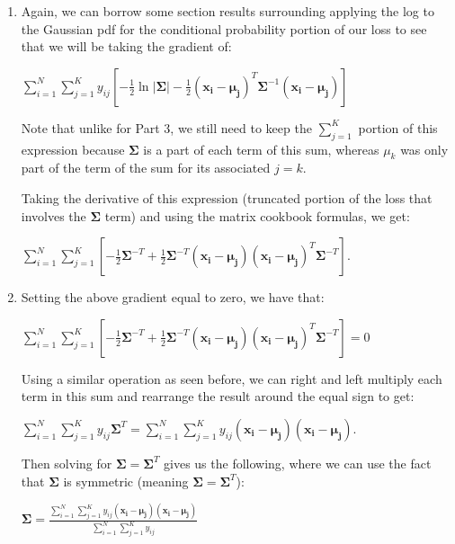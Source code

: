 \documentclass[submit]{harvardml}
\begin{document}
\begin{enumerate}
     \item  Again, we can borrow some section results surrounding applying the log to the Gaussian pdf for the conditional probability portion of our loss to see that we will be taking the gradient of:
     
     $\sum_{i=1}^N \sum_{j=1}^K y_{ij}[-\frac{1}{2}\ln |\boldsymbol{\Sigma}| - \frac{1}{2}(\boldsymbol{x_i} - \boldsymbol{\mu_j})^T \boldsymbol{\Sigma}^{-1}(\boldsymbol{x_i} - \boldsymbol{\mu_j})]$
     
     Note that unlike for Part 3, we still need to keep the $\sum_{j=1}^K$ portion of this expression because $\boldsymbol{\Sigma}$ is a part of each term of this sum, whereas $\mu_k$ was only part of the term of the sum for its associated $j=k$. 
     
     Taking the derivative of this expression (truncated portion of the loss that involves the $\boldsymbol{\Sigma}$ term) and using the matrix cookbook formulas, we get:
     
     $\sum_{i=1}^N\sum_{j=1}^K[-\frac{1}{2}\boldsymbol{\Sigma}^{-T} + \frac{1}{2}\boldsymbol{\Sigma}^{-T}(\boldsymbol{x_i} - \boldsymbol{\mu_j}) (\boldsymbol{x_i} - \boldsymbol{\mu_j})^T\boldsymbol{\Sigma}^{-T}]$.
     
     \item Setting the above gradient equal to zero, we have that:
     
     $\sum_{i=1}^N\sum_{j=1}^K[-\frac{1}{2}\boldsymbol{\Sigma}^{-T} + \frac{1}{2}\boldsymbol{\Sigma}^{-T}(\boldsymbol{x_i} - \boldsymbol{\mu_j}) (\boldsymbol{x_i} - \boldsymbol{\mu_j})^T\boldsymbol{\Sigma}^{-T}] = 0$
     
     Using a similar operation as seen before, we can right and left multiply each term in this sum and rearrange the result around the equal sign to get:
     
     $\sum_{i=1}^N\sum_{j=1}^K y_{ij}\boldsymbol{\Sigma}^T = \sum_{i=1}^N\sum_{j=1}^K y_{ij}(\boldsymbol{x_i} - \boldsymbol{\mu_j}) (\boldsymbol{x_i} - \boldsymbol{\mu_j})$.
     
     Then solving for $\boldsymbol{\Sigma} = \boldsymbol{\Sigma}^T$ gives us the following, where we can use the fact that $\boldsymbol{\Sigma}$ is symmetric (meaning $\boldsymbol{\Sigma} = \boldsymbol{\Sigma}^T$):
     
     $\boldsymbol{\Sigma} = \frac{\sum_{i=1}^N\sum_{j=1}^K y_{ij}(\boldsymbol{x_i} - \boldsymbol{\mu_j}) (\boldsymbol{x_i} - \boldsymbol{\mu_j})}{\sum_{i=1}^N\sum_{j=1}^K y_{ij}}$
     
\end{enumerate}
\end{document}
